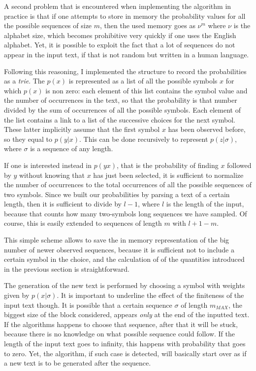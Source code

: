 \documentclass[conference]{IEEEtran}
\begin{document}
A second problem that is encountered when implementing the algorithm in practice is that if one attempts to store in memory the probability values for all the possible sequences of size $m$, then the used memory goes as $\nu^m$ where $\nu$ is the alphabet size, which becomes prohibitive very quickly if one uses the English alphabet. Yet, it is possible to exploit the fact that a lot of sequences do not appear in the input text, if that is not random but written in a human language.

Following this reasoning, I implemented the structure to record the probabilities as a \emph{trie}. The $p(x)$ is represented as a list of all the possible symbols $x$ for which $p(x)$ is non zero: each element of this list contains the symbol value and the number of occurrences in the text, so that the probability is that number divided by the sum of occurrences of all the possible symbols. Each element of the list contains a link to a list of the successive choices for the next symbol. These latter implicitly assume that the first symbol $x$ has been observed before, so they equal to $p(y|x)$. This can be done recursively to represent $p(z|\sigma)$, where $\sigma$ is a sequence of any length.

If one is interested instead in $p(yx)$, that is the probability of finding $x$ followed by $y$ without knowing that $x$ has just been selected, it is sufficient to normalize the number of occurrences to the total occurrences of all the possible sequences of two symbols. Since we built our probabilities by parsing a text of a certain length, then it is sufficient to divide by $l-1$, where $l$ is the length of the input, because that counts how many two-symbols long sequences we have sampled. Of course, this is easily extended to sequences of length $m$ with $l+1-m$.

This simple scheme allows to save the in memory representation of the big number of newer observed sequences, because it is sufficient not to include a certain symbol in the choice, and the calculation of of the quantities introduced in the previous section is straightforward.

The generation of the new text is performed by choosing a symbol with weights given by $p(x|\sigma)$. It is important to underline the effect of the finiteness of the input text though. It is possible that a certain sequence $\sigma$ of length $m_{MAX}$, the biggest size of the block considered, appears \emph{only} at the end of the inputted text. If the algorithms happens to choose that sequence, after that it will be stuck, because there is no knowledge on what possible sequence could follow. If the length of the input text goes to infinity, this happens with probability that goes to zero. Yet, the algorithm, if such case is detected, will basically start over as if a new text is to be generated after the sequence.
\end{document}
